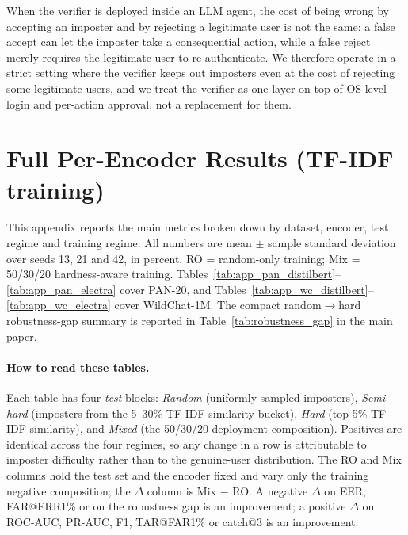 \documentclass[11pt]{article}
\renewcommand{\arraystretch}{1.05}
\begin{document}
When the verifier is deployed inside an LLM agent, the cost of being wrong by accepting an imposter and by rejecting a legitimate user is not the same: a false accept can let the imposter take a consequential action, while a false reject merely requires the legitimate user to re-authenticate. We therefore operate in a strict setting where the verifier keeps out imposters even at the cost of rejecting some legitimate users, and we treat the verifier as one layer on top of OS-level login and per-action approval, not a replacement for them.



\clearpage
\appendix

\raggedbottom
\captionsetup[table]{skip=3pt}
\renewcommand{\arraystretch}{0.85}
\setlength{\tabcolsep}{3pt}
\setcounter{topnumber}{4}
\setcounter{bottomnumber}{2}
\setcounter{totalnumber}{6}
\renewcommand{\topfraction}{0.95}
\renewcommand{\bottomfraction}{0.85}
\renewcommand{\textfraction}{0.05}
\renewcommand{\floatpagefraction}{0.80}
\makeatletter
\setlength{\@fptop}{0pt}
\setlength{\@dblfptop}{0pt}
\setlength{\@fpbot}{0pt plus 1fil}
\setlength{\@dblfpbot}{0pt plus 1fil}
\makeatother

\section{Full Per-Encoder Results (TF-IDF training)}
\label{sec:appendix_full}

This appendix reports the main metrics broken down by dataset, encoder, test regime and training regime. All numbers are mean $\pm$ sample standard deviation over seeds 13, 21 and 42, in percent. RO = random-only training; Mix = 50/30/20 hardness-aware training. Tables~\ref{tab:app_pan_distilbert}--\ref{tab:app_pan_electra} cover PAN-20, and Tables~\ref{tab:app_wc_distilbert}--\ref{tab:app_wc_electra} cover WildChat-1M. The compact random$\to$hard robustness-gap summary is reported in Table~\ref{tab:robustness_gap} in the main paper.

\paragraph{How to read these tables.} Each table has four \emph{test} blocks: \emph{Random} (uniformly sampled imposters), \emph{Semi-hard} (imposters from the 5--30\% TF-IDF similarity bucket), \emph{Hard} (top 5\% TF-IDF similarity), and \emph{Mixed} (the 50/30/20 deployment composition). Positives are identical across the four regimes, so any change in a row is attributable to imposter difficulty rather than to the genuine-user distribution. The RO and Mix columns hold the test set and the encoder fixed and vary only the training negative composition; the $\Delta$ column is Mix $-$ RO. A negative $\Delta$ on EER, FAR@FRR1\% or on the robustness gap is an improvement; a positive $\Delta$ on ROC-AUC, PR-AUC, F1, TAR@FAR1\% or catch@3 is an improvement.
\end{document}
